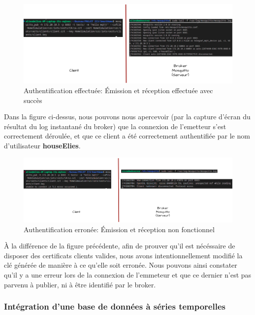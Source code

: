 \documentclass[10pt, a4paper]{report}
\begin{document}
	\begin{figure}[h!]
		\centering
		\includegraphics[width=1\textwidth]{ressources/img/preuves/emissionReceptionMosquittoValide.drawio}
		\caption{Authentification effectuée: Émission et réception effectuée avec succès}
		\label{fig:mosquittoValide}
	\end{figure}
	
	Dans la figure ci-dessus, nous pouvons nous apercevoir (par la capture d'écran du résultat du log instantané du broker) que la connexion de l'emetteur s'est correctement déroulée, et que ce client a été correctement authentifiée par le nom d'utilisateur \textbf{houseElies}. \newpage
	
	\begin{figure}[h!]
		\centering
		\includegraphics[width=1\textwidth]{ressources/img/preuves/emissionReceptionMosquittoInvalide.drawio}
		\caption{Authentification erronée: Émission et réception non fonctionnel}
		\label{fig:mosquittoInvalide}
	\end{figure}
	À la différence de la figure précédente, afin de prouver qu'il est nécéssaire de disposer des certificats clients valides, nous avons intentionnellement modifié la clé générée de manière à ce qu'elle soit erronée. Nous pouvons ainsi constater qu'il y a une erreur lors de la connexion de l'emmeteur et que ce dernier n'est pas parvenu à publier, ni à être identifié par le broker.
	
	
	
	\subsubsection{Intégration d'une base de données à séries temporelles}
	
\end{document}
